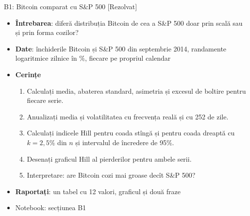 \begin{frame}{B1: Bitcoin comparat cu S\&P 500 [Rezolvat]}
\itemsize{\footnotesize}
\begin{itemize}
\item \textbf{Întrebarea}: diferă distribuția Bitcoin de cea a S\&P 500 doar prin scală sau și prin forma cozilor?
\item \textbf{Date}: închiderile Bitcoin și S\&P 500 din septembrie 2014, randamente logaritmice zilnice în \%, fiecare pe propriul calendar
\item \textbf{Cerințe}
\begin{enumerate}
    \item Calculați media, abaterea standard, asimetria și excesul de boltire pentru fiecare serie.
    \item Anualizați media și volatilitatea cu frecvența reală și cu 252 de zile.
    \item Calculați indicele Hill pentru coada stîngă și pentru coada dreaptă cu $k = 2{,}5\%$ din $n$ și intervalul de încredere de 95\%.
    \item Desenați graficul Hill al pierderilor pentru ambele serii.
    \item Interpretare: are Bitcoin cozi mai groase decît S\&P 500?
\end{enumerate}
\item \textbf{Raportați}: un tabel cu 12 valori, graficul și două fraze
\item Notebook: secțiunea B1
\end{itemize}
\end{frame}

